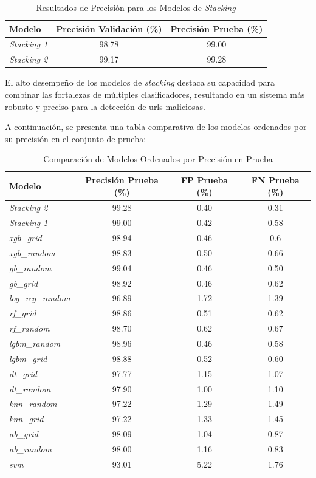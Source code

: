 \begin{table}[H]
    \centering
    \begin{tabular}{lcc}
        \hline
        \textbf{Modelo} & \textbf{Precisión Validación (\%)} & \textbf{Precisión Prueba (\%)} \\
        \hline
        \textit{Stacking 1} & 98.78 & 99.00 \\
        \textit{Stacking 2} & 99.17 & 99.28 \\
        \hline
    \end{tabular}
    \caption{Resultados de Precisión para los Modelos de \textit{Stacking}}
    \label{tab:stacking_results}
\end{table}

El alto desempeño de los modelos de \textit{stacking} destaca su capacidad para combinar las fortalezas de múltiples clasificadores, resultando en un sistema más robusto y preciso para la detección de \glspl{url} maliciosas.


A continuación, se presenta una tabla comparativa de los modelos ordenados por su precisión en el conjunto de prueba:

\begin{table}[H]
    \centering
    \begin{tabular}{lccc}
        \hline
        \textbf{Modelo} & \textbf{Precisión Prueba (\%)} & \textbf{FP Prueba (\%)} & \textbf{FN Prueba (\%)} \\
        \hline
        \textit{Stacking 2} & 99.28 & 0.40 & 0.31 \\
        \textit{Stacking 1} & 99.00 & 0.42 & 0.58 \\
        \textit{xgb\_grid} & 98.94 & 0.46 & 0.6 \\
        \textit{xgb\_random} & 98.83 & 0.50 & 0.66 \\
        \textit{gb\_random} & 99.04 & 0.46 & 0.50 \\
        \textit{gb\_grid} & 98.92 & 0.46 & 0.62 \\
        \textit{log\_reg\_random} & 96.89 & 1.72 & 1.39 \\
        \textit{rf\_grid} & 98.86 & 0.51 & 0.62 \\
        \textit{rf\_random} & 98.70 & 0.62 & 0.67 \\
        \textit{lgbm\_random} & 98.96 & 0.46 & 0.58 \\
        \textit{lgbm\_grid} & 98.88 & 0.52 & 0.60 \\
        \textit{dt\_grid} & 97.77 & 1.15 & 1.07 \\ 
        \textit{dt\_random} & 97.90 & 1.00 & 1.10 \\ 
        \textit{knn\_random} & 97.22 & 1.29 & 1.49 \\
        \textit{knn\_grid} & 97.22 & 1.33 & 1.45 \\
        \textit{ab\_grid} & 98.09 & 1.04 & 0.87 \\
        \textit{ab\_random} & 98.00 & 1.16 & 0.83 \\
        \textit{svm} &  93.01& 5.22 & 1.76 \\
        \hline
    \end{tabular}
    \caption{Comparación de Modelos Ordenados por Precisión en Prueba}
    \label{tab:model_comparison}
\end{table}